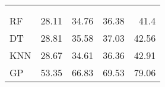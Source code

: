 \begin{margintable}
	\centering
	\begin{tabularx}{1\marginparwidth}{Xd{2.1}d{2.1}d{1.1}d{1.1}}
		\toprule
		&
		&    
		 &
		 &
		 \\
		\\
		\midrule
		RF & 28.11 & 34.76                     &36.38 & 41.4 \\ 
		DT & 28.81 					   & 35.58                     &37.03                     & 42.56 \\ 
		KNN& 28.67 					   & 34.61 &36.36                     & 42.91 \\ 
		GP & 53.35 					   & 66.83                     &69.53                     & 79.06 \\ \midrule
		

\end{tabularx}
\end{margintable}
